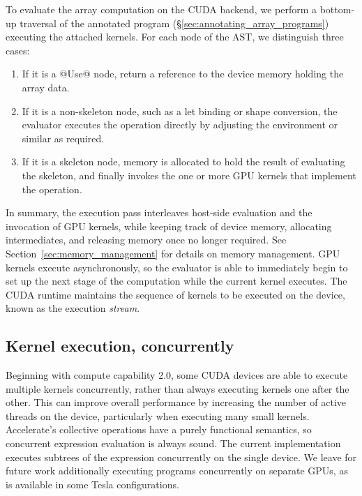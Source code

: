 To evaluate the array computation on the CUDA backend, we perform a bottom-up
traversal of the annotated program (\S\ref{sec:annotating_array_programs})
executing the attached kernels. For each node of the AST, we distinguish three
cases:
%
\begin{enumerate}
\item If it is a @Use@ node, return a reference to the device memory holding the
    array data.

\item If it is a non-skeleton node, such as a let binding or shape conversion,
    the evaluator executes the operation directly by adjusting the environment
    or similar as required.

\item If it is a skeleton node, memory is allocated to hold the result of
    evaluating the skeleton, and finally invokes the one or more GPU kernels
    that implement the operation.
\end{enumerate}
%
In summary, the execution pass interleaves host-side evaluation and the
invocation of GPU kernels, while keeping track of device memory, allocating
intermediates, and releasing memory once no longer required. See
Section~\ref{sec:memory_management} for details on memory management. GPU
kernels execute asynchronously, so the evaluator is able to immediately begin to
set up the next stage of the computation while the current kernel executes. The
CUDA runtime maintains the sequence of kernels to be executed on the device,
known as the execution \emph{stream}.

\subsection{Kernel execution, concurrently}

Beginning with compute capability 2.0, some CUDA devices are able to execute
multiple kernels concurrently, rather than always executing kernels one after
the other. This can improve overall performance by increasing the number of
active threads on the device, particularly when executing many small kernels.
Accelerate's collective operations have a purely functional semantics, so
concurrent expression evaluation is always sound. The current implementation
executes subtrees of the expression concurrently on the single device. We leave
for future work additionally executing programs concurrently on separate GPUs,
as is available in some Tesla configurations.

